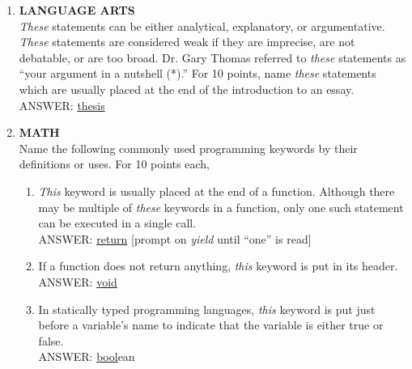 \documentclass{report}
\newcommand*{\backtrack}{\setcounter{enumi}{\numexpr\theenumi-1\relax}}
\begin{document}
\begin{enumerate}
    \item \textbf{LANGUAGE ARTS} \\ \textit{These} statements can be either analytical, explanatory, or argumentative. \textit{These} statements are considered weak if they are imprecise, are not debatable, or are too broad. Dr. Gary Thomas referred to \textit{these} statements as “your argument in a nutshell (*).” For 10 points, name \textit{these} statements which are usually placed at the end of the introduction to an essay. \\ 
    ANSWER: \underline{thesis} \backtrack
    \item \textbf{MATH} \\ Name the following commonly used programming keywords by their definitions or uses. For 10 points each,
    \begin{enumerate}[label=\Alph*]
        \item \textit{This} keyword is usually placed at the end of a function. Although there may be multiple of \textit{these} keywords in a function, only one such statement can be executed in a single call. \\ ANSWER: \underline{return} [prompt on \textit{yield} until ``one'' is read]
        \item If a function does not return anything, \textit{this} keyword is put in its header. \\ ANSWER: \underline{void}
        \item In statically typed programming languages, \textit{this} keyword is put just before a variable’s name to indicate that the variable is either true or false. \\ ANSWER: \underline{bool}ean
    \end{enumerate}


\end{enumerate}
\end{document}
